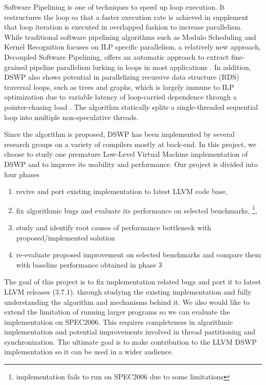 \documentclass[letterpaper, 10 pt, conference]{ieeeconf}  %
\begin{document}
Software Pipelining\cite{c10} is one of techniques to speed up loop execution. It restructures the loop so that a faster execution rate is achieved in supplement that loop iteration is executed in overlapped fashion to increase parallelism. While traditional software pipelining algorithms such as Modulo Scheduling and Kernel Recognition \cite{c11} focuses on ILP specific parallelism, a relatively new approach, Decoupled Software Pipelining, offers an automatic approach to extract fine-grained pipeline parallelism lurking in loops in most applications \cite{c3}. In addition, DSWP also shows potential in parallelizing recursive data structure (RDS) traversal loops, such as trees and graphs, which is largely immune to ILP optimization due to variable latency of loop-carried dependence through a pointer-chasing load \cite{c12}. The algorithm statically splits a single-threaded sequential loop into multiple non-speculative threads. 

Since the algorithm is proposed, DSWP has been implemented by several research groups on a variety of compilers mostly at back-end. In this project, we choose to study one premature Low-Level Virtual Machine implementation of DSWP and to improve its usability and performance. Our project is divided into four phases
\begin{enumerate}
\item revive and port existing implementation to latest LLVM code base,
\item fix algorithmic bugs and evaluate its performance on selected benchmarks, \footnote{\cite{c2} implementation fails to run on SPEC2006 due to some limitations},
\item study and identify root causes of performance bottleneck with proposed/implemented solution
\item re-evaluate proposed improvement on selected benchmarks and compare them with baseline performance obtained in phase 3
\end{enumerate}

The goal of this project is to fix implementation related bugs and port it to latest LLVM releases (3.7.1). through studying the existing implementation and fully understanding the algorithm and mechanisms behind it. We also would like to extend the limitation of running larger programs so we can evaluate the implementation on SPEC2006. This requires completeness in algorithmic implementation and potential improvements involved in thread partitioning and synchronization. The ultimate goal is to make contribution to the LLVM DSWP implementation so it can be used in a wider audience.
\end{document}
